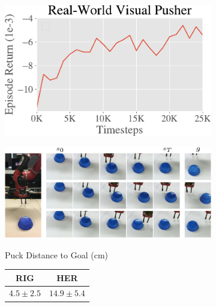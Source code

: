 \begin{figure}
    \centering
    \begin{subfigure}[b]{0.28\textwidth}
        \includegraphics[width=1\linewidth]{rig/img/pusher_learning_curve-crop.pdf}
    \end{subfigure}
    \begin{subfigure}[b]{0.4\textwidth}
        \includegraphics[width=1\linewidth]{rig/img/real_pusher_rollouts.pdf}
    \end{subfigure}
    \begin{subfigure}[b]{0.3\textwidth}
        \begin{flushright}
            Puck Distance to Goal (cm) \\
            \vspace{0.1cm}           
            {\renewcommand{\arraystretch}{1.2}%
            \begin{tabular}{  c | c }
             \hline
                RIG & HER  \\ \hline
                $\mathbf{4.5 \pm 2.5}$ & $14.9 \pm 5.4$  \\
            \end{tabular}
            }

\end{flushright}
\end{subfigure}
\end{figure}
